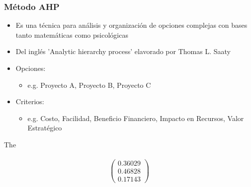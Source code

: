 \documentclass{beamer}
\begin{document}
\begin{frame}
  \frametitle{Método AHP}
  \begin{itemize}
    \item Es una técnica para análisis y organización de opciones complejas con bases tanto matemáticas como psicológicas
    \item Del inglés 'Analytic hierarchy process' elavorado por Thomas L. Saaty
    \item Opciones:
      \begin{itemize}
      \item e.g. Proyecto A, Proyecto B, Proyecto C
      \end{itemize}
    \item Criterios:
      \begin{itemize}
      \item e.g. Costo, Facilidad, Beneficio Financiero, Impacto en Recursos, Valor Estratégico
      \end{itemize}
  \end{itemize}
The 
\\
\\



\newline
\[ \left( \begin{array}{c}
  0.36029 \\
   0.46828 \\
   0.17143  \end{array} \right)\]
\\
\newline



\end{frame}
\end{document}

